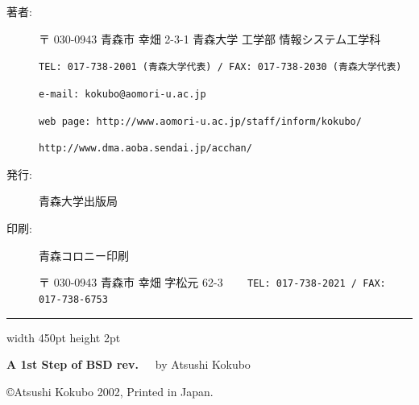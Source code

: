 \begin{description}
\item[著者:]  

〒 030-0943 青森市 幸畑 2-3-1 青森大学 工学部 情報システム工学科

\texttt{TEL: 017-738-2001 (青森大学代表) / FAX: 017-738-2030 (青森大学代表)}

\texttt{e-mail: kokubo@aomori-u.ac.jp}

\texttt{web page: http://www.aomori-u.ac.jp/staff/inform/kokubo/}

\hspace*{2.2cm}\texttt{http://www.dma.aoba.sendai.jp/acchan/}
\item[発行:] 青森大学出版局

\item[印刷:] 青森コロニー印刷

〒 030-0943 青森市 幸畑 字松元 62-3 ~~~ \texttt{TEL: 017-738-2021 / FAX: 017-738-6753}
\end{description}

\hrule width 450pt height 2pt
\vspace*{1mm}

\noindent
\textbf{\LARGE A 1st Step of BSD rev.}~~~by Atsushi Kokubo

\noindent
\copyright Atsushi Kokubo 2002, Printed in Japan.
